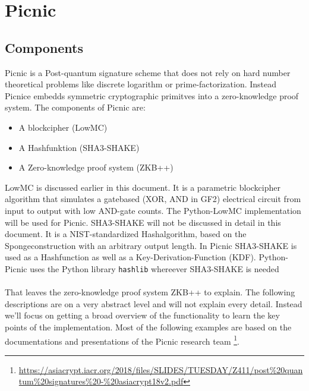 \documentclass[]{article}
\begin{document}
\section{Picnic}
\subsection{Components}
Picnic is a Post-quantum signature scheme that does not rely on hard number theoretical problems like discrete logarithm or prime-factorization. Instead Picnice embedds symmetric cryptographic primitves into a zero-knowledge proof system. The components of Picnic are:
\begin{itemize}
\item{A blockcipher (LowMC)}
\item{A Hashfunktion (SHA3-SHAKE)}
\item{A Zero-knowledge proof system (ZKB++)}
\end{itemize}
LowMC is discussed earlier in this document. It is a parametric blockcipher algorithm that simulates a gatebased (XOR, AND in GF2) electrical circuit from input to output with low AND-gate counts. The Python-LowMC implementation will be used for Picnic. SHA3-SHAKE will not be discussed in detail in this document. It is a NIST-standardized Hashalgorithm, based on the Spongeconstruction with an arbitrary output length. In Picnic SHA3-SHAKE is used as a Hashfunction as well as a Key-Derivation-Function (KDF). Python-Picnic uses the Python library \texttt{hashlib} whereever SHA3-SHAKE is needed\\ \\
That leaves the zero-knowledge proof system ZKB++ to explain. The following descriptions are on a very abstract level and will not explain every detail. Instead we'll focus on getting a broad overview of the functionality to learn the key points of the implementation. Most of the following examples are based on the documentations and presentations of the Picnic research team \footnote{\url{https://asiacrypt.iacr.org/2018/files/SLIDES/TUESDAY/Z411/post\%20quantum\%20signatures\%20-\%20asiacrypt18v2.pdf}}.
\end{document}

